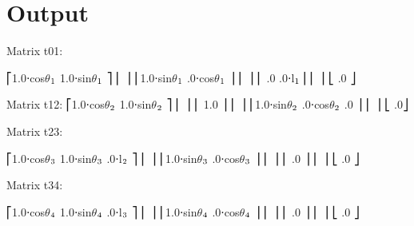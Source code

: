 \documentclass[letterpaper,10pt,english,openany,oneside]{sphinxmanual}
\begin{document}
\section{Output}
\label{\detokenize{Forward_Kinematics:output}}
%
\begin{sphinxVerbatim}[commandchars=\\\{\}]
Matrix t\PYGZus{}0\PYGZus{}1:

⎡1.0⋅cos\(\theta\)\(\sb{\text{1}}\)  \PYGZhy{}1.0⋅sin\(\theta\)\(\sb{\text{1}}\)            ⎤
⎢                                      ⎥
⎢1.0⋅sin\(\theta\)\(\sb{\text{1}}\)  .0⋅cos\(\theta\)\(\sb{\text{1}}\)             ⎥
⎢                                      ⎥
⎢                         .0  .0⋅l\(\sb{\text{1}}\)⎥
⎢                                      ⎥
⎣                              .0  ⎦


Matrix t\PYGZus{}1\PYGZus{}2:
⎡1.0⋅cos\(\theta\)\(\sb{\text{2}}\)  \PYGZhy{}1.0⋅sin\(\theta\)\(\sb{\text{2}}\)          ⎤
⎢                                    ⎥
⎢                         \PYGZhy{}1.0    ⎥
⎢                                    ⎥
⎢1.0⋅sin\(\theta\)\(\sb{\text{2}}\)  .0⋅cos\(\theta\)\(\sb{\text{2}}\)   .0      ⎥
⎢                                    ⎥
⎣                              .0⎦


Matrix t\PYGZus{}2\PYGZus{}3:

⎡1.0⋅cos\(\theta\)\(\sb{\text{3}}\)  \PYGZhy{}1.0⋅sin\(\theta\)\(\sb{\text{3}}\)      .0⋅l\(\sb{\text{2}}\) ⎤
⎢                                      ⎥
⎢1.0⋅sin\(\theta\)\(\sb{\text{3}}\)  .0⋅cos\(\theta\)\(\sb{\text{3}}\)             ⎥
⎢                                      ⎥
⎢                         .0       ⎥
⎢                                      ⎥
⎣                              .0  ⎦


Matrix t\PYGZus{}3\PYGZus{}4:

⎡1.0⋅cos\(\theta\)\(\sb{\text{4}}\)  \PYGZhy{}1.0⋅sin\(\theta\)\(\sb{\text{4}}\)      .0⋅l\(\sb{\text{3}}\) ⎤
⎢                                      ⎥
⎢1.0⋅sin\(\theta\)\(\sb{\text{4}}\)  .0⋅cos\(\theta\)\(\sb{\text{4}}\)             ⎥
⎢                                      ⎥
⎢                         .0       ⎥
⎢                                      ⎥
⎣                              .0  ⎦



\end{sphinxVerbatim}
\end{document}
